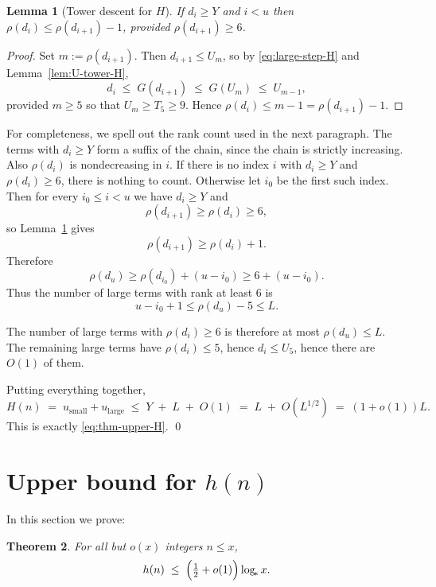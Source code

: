 \documentclass[11pt,reqno]{amsart}
\theoremstyle{plain}
\newtheorem{theorem}{Theorem}[section]
\newtheorem{lemma}[theorem]{Lemma}
\theoremstyle{definition}
\newcommand{\logstar}{\log_{\!*}}
\begin{document}
\begin{lemma}[Tower descent for $H$]\label{lem:tower-descent-H}
If $d_i\ge Y$ and $i<u$ then $\rho(d_i)\le \rho(d_{i+1})-1$, provided
$\rho(d_{i+1})\ge 6$.
\end{lemma}

\begin{proof}
Set $m:=\rho(d_{i+1})$. Then $d_{i+1}\le U_m$, so by \eqref{eq:large-step-H} and
Lemma~\ref{lem:U-tower-H},
\begin{equation}\label{eq:tower-descent-H-comp}
d_i \;\le\; G(d_{i+1}) \;\le\; G(U_m) \;\le\; U_{m-1},
\end{equation}
provided $m\ge 5$ so that $U_m\ge T_5\ge 9$. Hence $\rho(d_i)\le m-1=\rho(d_{i+1})-1$.
\end{proof}

For completeness, we spell out the rank count used in the next paragraph.
The terms with $d_i\ge Y$ form a suffix of the chain, since the chain is
strictly increasing. Also $\rho(d_i)$ is nondecreasing in $i$. If there is no
index $i$ with $d_i\ge Y$ and $\rho(d_i)\ge 6$, there is nothing to count.
Otherwise let $i_0$ be the first such index. Then for every $i_0\le i<u$ we
have $d_i\ge Y$ and
\[
\rho(d_{i+1})\ge \rho(d_i)\ge 6,
\]
so Lemma~\ref{lem:tower-descent-H} gives
\[
\rho(d_{i+1})\ge \rho(d_i)+1.
\]
Therefore
\[
\rho(d_u)\ge \rho(d_{i_0})+(u-i_0)\ge 6+(u-i_0).
\]
Thus the number of large terms with rank at least $6$ is
\[
u-i_0+1\le \rho(d_u)-5\le L.
\]

The number of large terms with $\rho(d_i)\ge 6$ is therefore at most $\rho(d_u)\le L$. The remaining large terms have $\rho(d_i)\le 5$, hence $d_i\le U_5$, hence there are $O(1)$ of them.

Putting everything together,
\begin{equation}\label{eq:H-final-bound}
H(n) \;=\; u_{\mathrm{small}}+u_{\mathrm{large}}
\;\le\; Y \;+\; L \;+\; O(1)
\;=\; L \;+\; O(L^{1/2})
\;=\; (1+o(1))L.
\end{equation}
This is exactly \eqref{eq:thm-upper-H}. \qed

\section{Upper bound for $h(n)$}\label{sec:upper-h}

In this section we prove:

\begin{theorem}\label{thm:upper-h}
For all but $o(x)$ integers $n\le x$,
\begin{equation}\label{eq:thm-upper-h}
h(n) \;\le\; \Bigl(\tfrac12 + o(1)\Bigr)\logstar x.
\end{equation}
\end{theorem}
\end{document}
